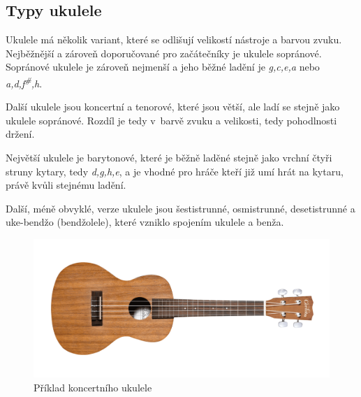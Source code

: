 \subsection{Typy ukulele}
Ukulele má několik variant, které se odlišují velikostí nástroje a barvou zvuku. Nejběžnější a zároveň doporučované pro začátečníky je ukulele sopránové. Sopránové ukulele je zároveň nejmenší a jeho běžné ladění je \textit{g,c,e,a} nebo \textit{a,d,f\textsuperscript{\#},h}.

Další ukulele jsou koncertní a tenorové, které jsou větší, ale ladí se stejně jako ukulele sopránové. Rozdíl je tedy v~barvě zvuku a velikosti, tedy pohodlnosti držení.

Největší ukulele je barytonové, které je běžně laděné stejně jako vrchní čtyři struny kytary, tedy \textit{d,g,h,e}, a je vhodné pro hráče kteří již umí hrát na kytaru, právě kvůli stejnému ladění.

Další, méně obvyklé, verze ukulele jsou šestistrunné, osmistrunné, desetistrunné a uke-bendžo (bendžolele), které vzniklo spojením ukulele a benža.

\begin{figure}
    \centering
    \includegraphics[width=\textwidth]{assets/ukulele.png}
    \caption[Příklad koncertního ukulele]{Příklad koncertního ukulele \cite{cordobaguitars_2020_ukulele}}
    \label{fig:class_diagram}
\end{figure}